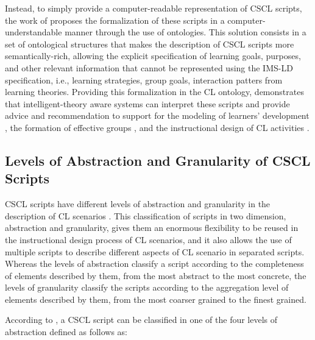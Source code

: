 Instead, to simply provide a computer-readable representation of CSCL scripts, the work of  proposes the formalization of these scripts in a computer-understandable manner through the use of ontologies. This solution consists in a set of ontological structures that makes the description of CSCL scripts more semantically-rich, allowing the explicit specification of learning goals, purposes, and other relevant information that cannot be represented using the IMS-LD specification, i.e., learning strategies, group goals, interaction patters from learning theories. Providing this formalization in the CL ontology,  demonstrates that intelligent-theory aware systems can interpret these scripts and provide advice and recommendation to support for the modeling of learners' development \cite{InabaIkedaMizoguchi2003}, the formation of effective groups \cite{IsotaniMizoguchi2008a}, and the instructional design of CL activities \cite{IsotaniMizoguchiIsotaniCapeliIsotanideAlbuquerqueBittencourtJaques2013}.

\subsection{Levels of Abstraction and Granularity of CSCL Scripts}
\label{sec:level-of-abstraction-and-granularity-of-cscl-scripts}

CSCL scripts have different levels of abstraction and granularity in the description of CL scenarios \cite{Dillenbourg2002, DillenbourgJermann2007, Villasclaras-FernandezIsotaniHayashiMizoguchi2009}. This classification of scripts in two dimension, abstraction and granularity, gives them an enormous flexibility to be reused in the instructional design process of CL scenarios, and it also allows the use of multiple scripts to describe different aspects of CL scenario in separated scripts. Whereas the levels of abstraction classify a script according to the completeness of elements described by them, from the most abstract to the most concrete, the levels of granularity classify the scripts according to the aggregation level of elements described by them, from the most coarser grained to the finest grained.

According to , a CSCL script can be classified in one of the four levels of abstraction defined as follows as:

